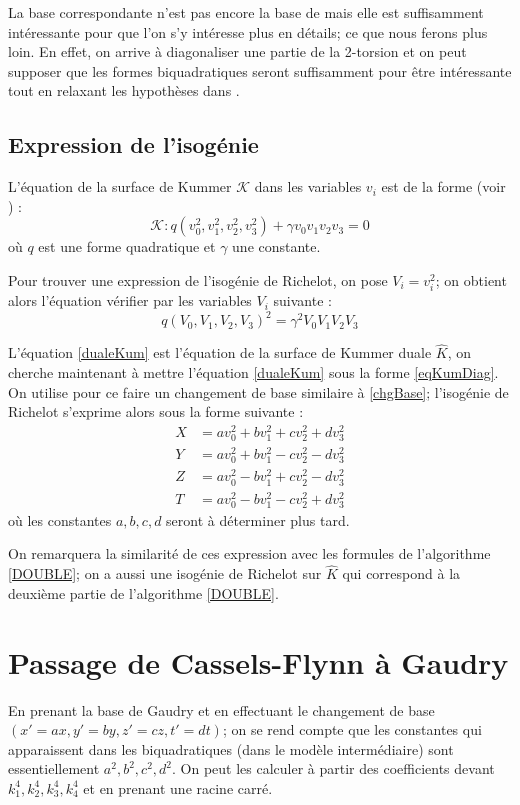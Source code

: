 \documentclass[a4paper]{article}
\theoremstyle{definition}
\theoremstyle{remark}
\numberwithin{equation}{section}
\begin{document}
La base correspondante n'est pas encore la base de \citet{gaudry} mais elle est suffisamment  intéressante pour que l'on s'y intéresse plus en détails; ce que nous ferons plus loin. En effet, on arrive à diagonaliser une partie de la 2-torsion et on peut supposer que les formes biquadratiques seront suffisamment pour être intéressante tout en relaxant les hypothèses dans \citep{gaudry}.

\subsection{Expression de l'isogénie}
L'équation de la surface de Kummer $\mathcal{K}$ dans les variables $v_i$ est de la forme (voir \citet{cassels-Flynn}) :
\begin{equation}
\label{eqKumDiag}
\mathcal{K} : q(v_0^2,v_1^2,v_2^2,v_3^2)+\gamma v_0v_1v_2v_3 = 0
\end{equation}
où $q$ est une forme quadratique et $\gamma$ une constante.

Pour trouver une expression de l'isogénie de Richelot, on pose $V_i = v_i^2$; on obtient alors l'équation vérifier par les variables $V_i$ suivante :
\begin{equation}
\label{dualeKum}
q(V_0,V_1,V_2,V_3)^2 = \gamma^2 V_0V_1V_2V_3
\end{equation}

L'équation \ref{dualeKum} est l'équation de la surface de Kummer duale $\hat{K}$, on cherche maintenant à mettre l'équation \ref{dualeKum} sous la forme \ref{eqKumDiag}. On utilise pour ce faire un changement de base similaire à \ref{chgBase}; l'isogénie de Richelot s'exprime alors sous la forme suivante :
\begin{align*}
X &= av_0^2+bv_1^2+cv_2^2+dv_3^2 \\
Y &= av_0^2+bv_1^2-cv_2^2-dv_3^2 \\
Z &= av_0^2-bv_1^2+cv_2^2-dv_3^2 \\
T &= av_0^2-bv_1^2-cv_2^2+dv_3^2
\end{align*}
où les constantes $a,b,c,d$ seront à déterminer plus tard.

On remarquera la similarité de ces expression avec les formules de l'algorithme \ref{DOUBLE}; on a aussi une isogénie de Richelot sur $\hat{K}$ qui correspond à la deuxième partie de l'algorithme \ref{DOUBLE}.

\section{Passage de Cassels-Flynn à Gaudry}
En prenant la base de Gaudry et en effectuant le changement de base $(x'=ax,y'=by,z'=cz,t'=dt)$; on se rend compte que les constantes qui apparaissent dans les biquadratiques (dans le modèle intermédiaire) sont essentiellement $a^2,b^2,c^2,d^2$. On peut les calculer à partir des coefficients devant $k_1^4,k_2^4,k_3^4,k_4^4$ et en prenant une racine carré.
\end{document}
